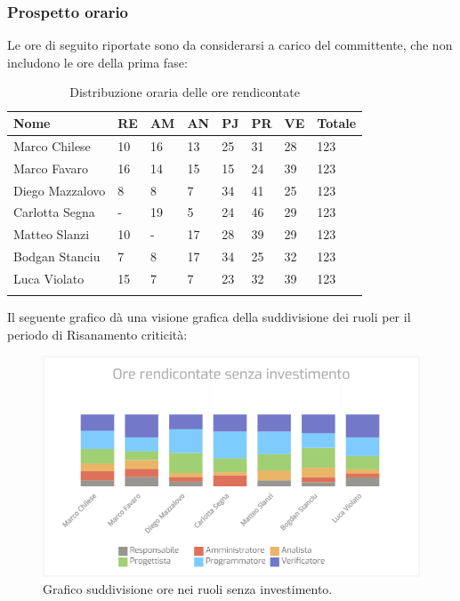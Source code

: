 \subsubsection{Prospetto orario}

Le ore di seguito riportate sono da considerarsi a carico del committente, che non includono le ore della prima fase:

\begin{longtable}{|C{.30\textwidth}|C{.06\textwidth}|C{.06\textwidth}|C{.06\textwidth} | C{.06\textwidth}| C{.06\textwidth} | C{.06\textwidth} | C{.10\textwidth} |}
\hline
\textbf{Nome} & \textbf{RE} & \textbf{AM} & \textbf{AN} & \textbf{PJ} & \textbf{PR} & \textbf{VE} & \textbf{Totale}\\
\hline 
Marco Chilese & 10 & 16 & 13 & 25 & 31 & 28 & 123\\
\hline
Marco Favaro & 16 & 14 & 15 & 15 & 24 & 39 & 123\\
\hline
Diego Mazzalovo & 8 & 8 & 7 & 34 & 41 & 25 & 123\\
\hline
Carlotta Segna & - & 19 & 5 & 24 & 46 & 29 & 123\\
\hline
Matteo Slanzi & 10 & - & 17 & 28 & 39 & 29 & 123\\
\hline
Bodgan Stanciu & 7 & 8 & 17 & 34 & 25 & 32 & 123\\
\hline
Luca Violato & 15 & 7 & 7 & 23 & 32 & 39 & 123 \\
\hline

\caption{Distribuzione oraria delle ore rendicontate}
\label{Distribuzione oraria delle ore rendicontate}
\end{longtable}

Il seguente grafico dà una visione grafica della suddivisione dei ruoli per il periodo di Risanamento criticità:\begin{figure}[H]
	\centering
  		\includegraphics[width=1\linewidth]{./images/totale_ore_rendicontate_senza_investimento.png}
  		\caption{Grafico suddivisione ore nei ruoli senza investimento.}
  		\label{fig:grafico suddivione ruoli}
\end{figure}


